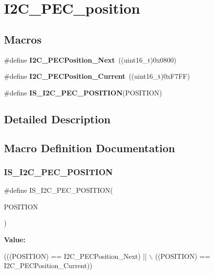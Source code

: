 \hypertarget{group___i2_c___p_e_c__position}{}\section{I2\+C\+\_\+\+P\+E\+C\+\_\+position}
\label{group___i2_c___p_e_c__position}
\subsection*{Macros}
\begin{DoxyCompactItemize}
\item 
\mbox{\label{group___i2_c___p_e_c__position_ga74d0996efe6e278fb28d053ba78fccc5}} 
\#define {\bfseries I2\+C\+\_\+\+P\+E\+C\+Position\+\_\+\+Next}~((uint16\+\_\+t)0x0800)
\item 
\mbox{\label{group___i2_c___p_e_c__position_ga8a393364dd651f88bcaebac71c1c52c7}} 
\#define {\bfseries I2\+C\+\_\+\+P\+E\+C\+Position\+\_\+\+Current}~((uint16\+\_\+t)0x\+F7\+F\+F)
\item 
\#define {\bfseries I\+S\+\_\+\+I2\+C\+\_\+\+P\+E\+C\+\_\+\+P\+O\+S\+I\+T\+I\+ON}(P\+O\+S\+I\+T\+I\+ON)
\end{DoxyCompactItemize}


\subsection{Detailed Description}


\subsection{Macro Definition Documentation}
\mbox{\label{group___i2_c___p_e_c__position_gac8611a62b06256b1b3c60d4859a016ef}} 
\subsubsection{\texorpdfstring{I\+S\+\_\+\+I2\+C\+\_\+\+P\+E\+C\+\_\+\+P\+O\+S\+I\+T\+I\+ON}{IS\_I2C\_PEC\_POSITION}}
{\footnotesize\ttfamily \#define I\+S\+\_\+\+I2\+C\+\_\+\+P\+E\+C\+\_\+\+P\+O\+S\+I\+T\+I\+ON(\begin{DoxyParamCaption}\item[{}]{P\+O\+S\+I\+T\+I\+ON }\end{DoxyParamCaption})}

{\bfseries Value\+:}
\begin{DoxyCode}
(((POSITION) == I2C\_PECPosition\_Next) || \(\backslash\)
                                       ((POSITION) == I2C\_PECPosition\_Current))
\end{DoxyCode}
